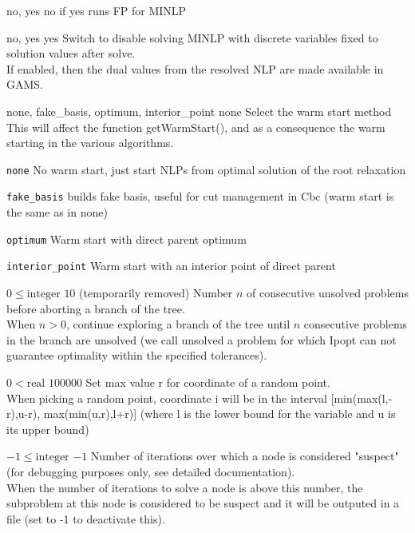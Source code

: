 %
{\ttfamily no, yes}%
{no}%
{if yes runs FP for MINLP}%
{
}

%
{\ttfamily no, yes}%
{yes}%
{Switch to disable solving MINLP with discrete variables fixed to solution values after solve.\\
If enabled, then the dual values from the resolved NLP are made available in GAMS.}%
{}

%
{\ttfamily none, fake\_basis, optimum, interior\_point}%
{none}%
{Select the warm start method\\
This will affect the function getWarmStart(), and as a consequence the warm starting in the various algorithms.}%
{\begin{list}{}{
\setlength{\parsep}{0em}
\setlength{\leftmargin}{5ex}
\setlength{\labelwidth}{2ex}
\setlength{\itemindent}{0ex}
\setlength{\topsep}{0pt}}
\item[\texttt{none}] No warm start, just start NLPs from optimal solution of the root relaxation
\item[\texttt{fake\_basis}] builds fake basis, useful for cut management in Cbc (warm start is the same as in none)
\item[\texttt{optimum}] Warm start with direct parent optimum
\item[\texttt{interior\_point}] Warm start with an interior point of direct parent
\end{list}
}

%
{$0\leq\textrm{integer}$}%
{$10$}%
{(temporarily removed) Number $n$ of consecutive unsolved problems before aborting a branch of the tree.\\
When $n > 0$, continue exploring a branch of the tree until $n$ consecutive problems in the branch are unsolved (we call unsolved a problem for which Ipopt can not guarantee optimality within the specified tolerances).}%
{}

%
{$0<\textrm{real}$}%
{$100000$}%
{Set max value r for coordinate of a random point.\\
When picking a random point, coordinate i will be in the interval [min(max(l,-r),u-r), max(min(u,r),l+r)] (where l is the lower bound for the variable and u is its upper bound)}%
{}

%
{$-1\leq\textrm{integer}$}%
{$-1$}%
{Number of iterations over which a node is considered "suspect" (for debugging purposes only, see detailed documentation).\\
When the number of iterations to solve a node is above this number, the subproblem at this node is considered to be suspect and it will be outputed in a file (set to -1 to deactivate this).}%
{}

